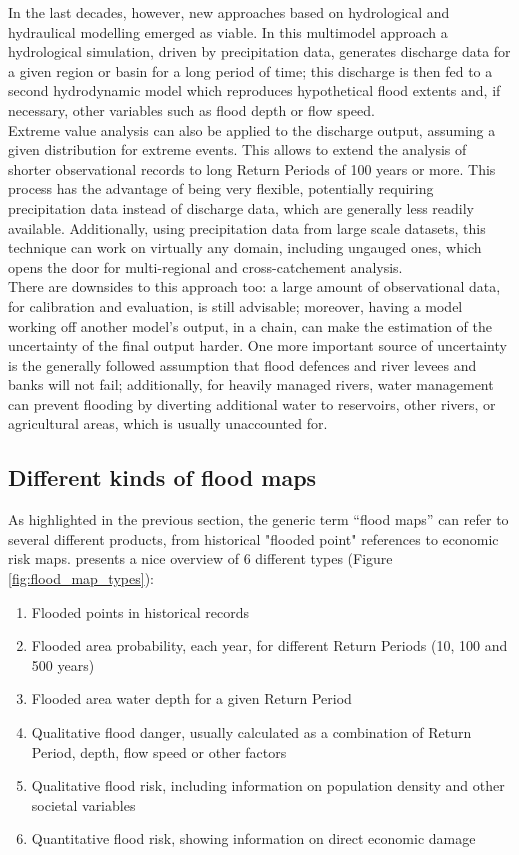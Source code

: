 In the last decades, however, new approaches based on hydrological and hydraulical modelling emerged as viable. In this multimodel approach a hydrological simulation, driven by precipitation data, generates discharge data for a given region or basin for a long period of time; this discharge  is then fed to a second hydrodynamic model which reproduces hypothetical flood extents and, if necessary, other variables such as flood depth or flow speed.\\
Extreme value analysis can also be applied to the discharge output, assuming a given distribution for extreme events. This allows to extend the analysis of shorter observational records to long Return Periods of 100 years or more. This process has the advantage of being very flexible, potentially requiring precipitation data instead of discharge data, which are generally less readily available. Additionally, using precipitation data from large scale datasets, this technique can work on virtually any domain, including ungauged ones, which opens the door for multi-regional and cross-catchement analysis.\\

There are downsides to this approach too: a large amount of observational data, for calibration and evaluation, is still advisable; moreover, having a model working off another model's output, in a chain, can make the estimation of the uncertainty of the final output harder. One more important source of uncertainty is the generally followed assumption that flood defences and river levees and banks will not fail; additionally, for heavily managed rivers, water management can prevent flooding by diverting additional water to reservoirs, other rivers, or agricultural areas, which is usually unaccounted for.

\subsection{Different kinds of flood maps} \label{sec:flood_map_types}
As highlighted in the previous section, the generic term \enquote{flood maps} can refer to several different products, from historical "flooded point" references to economic risk maps. \citet{DeMoel2009} presents a nice overview of 6 different types (Figure \ref{fig:flood_map_types}):

\begin{enumerate}[label=\Alph*] %
\item Flooded points in historical records
\item Flooded area probability, each year, for different Return Periods (10, 100 and 500 years)\label{enum:RP_map}
\item Flooded area water depth for a given Return Period
\item Qualitative flood danger, usually calculated as a combination of Return Period, depth, flow speed or other factors
\item Qualitative flood risk, including information on population density and other societal variables
\item Quantitative flood risk, showing information on direct economic damage
\end{enumerate}

